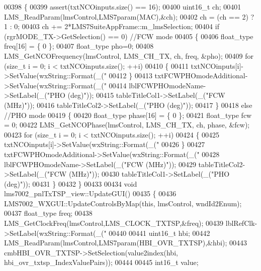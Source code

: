 \begin{DoxyCode}
{{{{{{00398 \{
00399     assert(txtNCOinputs.size() == 16);
00400     uint16\_t ch;
00401     LMS_ReadParam(lmsControl,LMS7param(MAC),&ch);
00402     ch = (ch == 2) ? 1 : 0;
00403     ch += 2*LMS7SuiteAppFrame::m_lmsSelection;
00404     \textcolor{keywordflow}{if} (rgrMODE_TX->GetSelection() == 0) \textcolor{comment}{//FCW mode}
00405     \{
00406         float_type freq[16] = \{ 0 \};
00407         float_type pho=0;
00408         LMS_GetNCOFrequency(lmsControl, LMS_CH_TX, ch, freq, &pho);
00409         \textcolor{keywordflow}{for} (\textcolor{keywordtype}{size\_t} i = 0; i < txtNCOinputs.size(); ++i)
00410         \{
00411             txtNCOinputs[i]->SetValue(wxString::Format(\_(\textcolor{stringliteral}{"%
00412         \}
00413         txtFCWPHOmodeAdditional->SetValue(wxString::Format(\_(\textcolor{stringliteral}{"%
00414         lblFCWPHOmodeName->SetLabel(\_(\textcolor{stringliteral}{"PHO (deg)"}));
00415         tableTitleCol1->SetLabel(\_(\textcolor{stringliteral}{"FCW (MHz)"}));
00416         tableTitleCol2->SetLabel(\_(\textcolor{stringliteral}{"PHO (deg)"}));
00417     \}
00418     \textcolor{keywordflow}{else} \textcolor{comment}{//PHO mode}
00419     \{
00420         float_type phase[16] = \{ 0 \};
00421         float_type fcw = 0;
00422         LMS_GetNCOPhase(lmsControl, LMS_CH_TX, ch, phase, &fcw);
00423         \textcolor{keywordflow}{for} (\textcolor{keywordtype}{size\_t} i = 0; i < txtNCOinputs.size(); ++i)
00424         \{
00425             txtNCOinputs[i]->SetValue(wxString::Format(\_(\textcolor{stringliteral}{"%
00426         \}
00427         txtFCWPHOmodeAdditional->SetValue(wxString::Format(\_(\textcolor{stringliteral}{"%
00428         lblFCWPHOmodeName->SetLabel(\_(\textcolor{stringliteral}{"FCW (MHz)"}));
00429         tableTitleCol2->SetLabel(\_(\textcolor{stringliteral}{"FCW (MHz)"}));
00430         tableTitleCol1->SetLabel(\_(\textcolor{stringliteral}{"PHO (deg)"}));
00431     \}
00432 \}
00433 
00434 \textcolor{keywordtype}{void} lms7002_pnlTxTSP_view::UpdateGUI()
00435 \{
00436     LMS7002_WXGUI::UpdateControlsByMap(\textcolor{keyword}{this}, lmsControl, wndId2Enum);
00437     float_type freq;
00438     LMS_GetClockFreq(lmsControl,LMS_CLOCK_TXTSP,&freq);
00439     lblRefClk->SetLabel(wxString::Format(\_(\textcolor{stringliteral}{"%
00440 
00441     uint16\_t hbi;
00442     LMS_ReadParam(lmsControl,LMS7param(HBI_OVR_TXTSP),&hbi);
00443     cmbHBI_OVR_TXTSP->SetSelection(value2index(hbi, 
      hbi_ovr_txtsp_IndexValuePairs));
00444 
00445     int16\_t value;
}}}}}}}}}}}
\end{DoxyCode}
